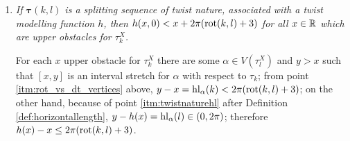 \begin{rmk}
\begin{enumerate}
\item \label{itm:tmfbeyondrot} \textit{If $\bm\tau(k,l)$ is a splitting sequence of twist nature, associated with a twist modelling function $h$, then $h(x,0)<x+2\pi(\mathrm{rot}(k,l)+3)$ for all $x\in\mathbb R$ which are upper obstacles for $\tau_k^X$.}

For each $x$ upper obstacle for $\tau_k^X$ there are some $\alpha\in V(\tau_l^X)$ and $y>x$ such that $[x,y]$ is an interval stretch for $\alpha$ with respect to $\tau_k$; from point \ref{itm:rot_vs_dt_vertices} above, $y-x=\mathrm{hl}_\alpha(k)<2\pi(\mathrm{rot}(k,l)+3)$; on the other hand, because of point \ref{itm:twistnaturehl} after Definition \ref{def:horizontallength}, $y-h(x)=\mathrm{hl}_\alpha(l)\in(0,2\pi)$; therefore $h(x)-x\leq 2\pi(\mathrm{rot}(k,l)+3)$.
\end{enumerate}
\end{rmk}

